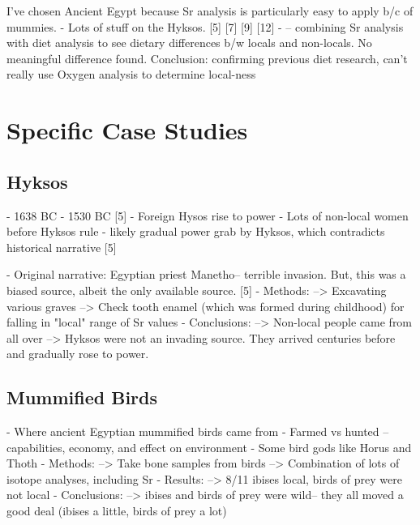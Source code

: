 \documentclass[a4paper, 12pt]{article}
\begin{document}
I've chosen Ancient Egypt because Sr analysis is particularly easy to apply b/c of mummies.
- Lots of stuff on the Hyksos. [5] [7] [9] [12]
- \citep{kozieradzkaogunmakin2021} -- combining Sr analysis with diet analysis to see dietary differences b/w locals and non-locals. No meaningful difference found. Conclusion: confirming previous diet research, can't really use Oxygen analysis to determine local-ness


\section{Specific Case Studies}
\subsection{Hyksos}
- 1638 BC - 1530 BC [5]
- Foreign Hysos rise to power
- Lots of non-local women before Hyksos rule - likely gradual power grab by Hyksos, which contradicts historical narrative [5]

- Original narrative: Egyptian priest Manetho-- terrible invasion. But, this was a biased source, albeit the only available source. [5]
- Methods:
--> Excavating various graves
--> Check tooth enamel (which was formed during childhood) for falling in "local" range of Sr values
- Conclusions:
--> Non-local people came from all over
--> Hyksos were not an invading source. They arrived centuries before and gradually rose to power.

\subsection{Mummified Birds}
- Where ancient Egyptian mummified birds came from
- Farmed vs hunted -- capabilities, economy, and effect on environment
- Some bird gods like Horus and Thoth
- Methods:
--> Take bone samples from birds
--> Combination of lots of isotope analyses, including Sr
- Results:
--> 8/11 ibises local, birds of prey were not local
- Conclusions:
--> ibises and birds of prey were wild-- they all moved a good deal (ibises a little, birds of prey a lot)
\end{document}
